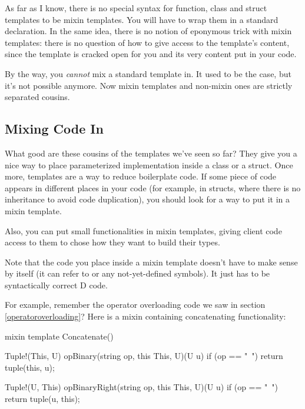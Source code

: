 As far as I know, there is no special syntax for function, class and struct templates to be mixin templates. You will have to wrap them in a standard  declaration. In the same idea, there is no notion of eponymous trick with mixin templates: there is no question of how to give access to the template's content, since the template is cracked open for you and its very content put in your code.


By the way, you \emph{cannot} mix a standard template in. It used to be the case, but it's not possible anymore. Now mixin templates and non-mixin ones are strictly separated cousins.

\subsection{Mixing Code In}\label{mixincodein}

What good are these cousins of the templates we've seen so far? They give you a nice way to place parameterized implementation inside a class or a struct. Once more, templates are a way to reduce boilerplate code. If some piece of code appears in different places in your code (for example, in structs, where there is no inheritance to avoid code duplication), you should look for a way to put it in a mixin template.

Also, you can put small functionalities in mixin templates, giving client code access to them to chose how they want to build their types.

Note that the code you place inside a mixin template doesn't have to make sense by itself (it can refer to  or any not-yet-defined symbols). It just has to be syntactically correct D code.

For example, remember the operator overloading code we saw in section \ref{operatoroverloading}? Here is a mixin containing concatenating functionality:

\begin{dcode}
mixin template Concatenate()
{
    Tuple!(This, U) opBinary(string op, this This, U)(U u) 
    if (op == "~")
    {
        return tuple(this, u);
    }

    Tuple!(U, This) opBinaryRight(string op, this This, U)(U u) 
    if (op == "~")
    {
        return tuple(u, this);
    }
}
\end{dcode}

